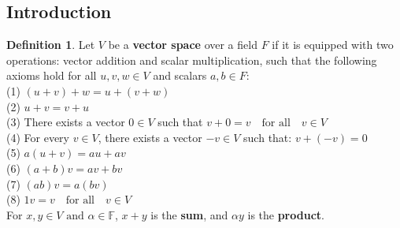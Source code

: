 \documentclass[12pt, reqno]{amsart}
\theoremstyle{definition}
\newtheorem{definition}[theorem]{Definition}
\numberwithin{equation}{section}
\newcommand{\dF}{{\mathbb F}}
\begin{document}
\subsection{Introduction}
\begin{definition}
    Let $V$ be a \textbf{vector space} over a field $F$ if it is equipped with two operations: vector addition and scalar multiplication, such that the following axioms hold for all $u, v, w \in V$ and scalars $a, b \in F$:\\
(1) $(u + v) + w = u + (v + w)$\\
(2) $u + v = v + u$\\
(3) There exists a vector $0 \in V$ such that $v + 0 = v \quad \text{for all} \quad v \in V$\\
(4) For every $v \in V$, there exists a vector $-v \in V$ such that: $v + (-v) = 0$\\
(5) $a  (u + v) = a  u + a  v$\\
(6) $(a + b)  v = a  v + b  v$\\
(7) $(a  b)  v = a  (b  v)$\\
(8) $1  v = v \quad \text{for all} \quad v \in V$\\

For $x,y \in V \text{ and } \alpha \in \dF$, $x+y$ is the \textbf{sum}, and $\alpha  y$ is the \textbf{product}.
\end{definition}
\end{document}

